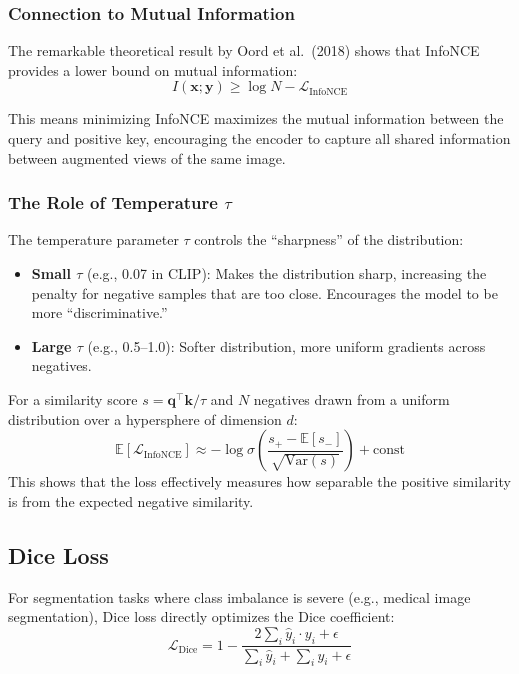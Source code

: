 \subsubsection{Connection to Mutual Information}

The remarkable theoretical result by Oord et al.\ (2018) \cite{oord2018representation} shows that InfoNCE provides a lower bound on mutual information:
\begin{equation}
I(\mathbf{x}; \mathbf{y}) \geq \log N - \mathcal{L}_{\text{InfoNCE}}
\end{equation}

This means minimizing InfoNCE maximizes the mutual information between the query and positive key, encouraging the encoder to capture all shared information between augmented views of the same image.

\subsubsection{The Role of Temperature $\tau$}

The temperature parameter $\tau$ controls the ``sharpness'' of the distribution:
\begin{itemize}
    \item \textbf{Small $\tau$} (e.g., 0.07 in CLIP): Makes the distribution sharp, increasing the penalty for negative samples that are too close. Encourages the model to be more ``discriminative.''
    \item \textbf{Large $\tau$} (e.g., 0.5--1.0): Softer distribution, more uniform gradients across negatives.
\end{itemize}

For a similarity score $s = \mathbf{q}^\top \mathbf{k} / \tau$ and $N$ negatives drawn from a uniform distribution over a hypersphere of dimension $d$:
\begin{equation}
\mathbb{E}[\mathcal{L}_{\text{InfoNCE}}] \approx -\log \sigma\!\left(\frac{s_{+} - \mathbb{E}[s_{-}]}{\sqrt{\text{Var}(s)}}\right) + \text{const}
\end{equation}
This shows that the loss effectively measures how separable the positive similarity is from the expected negative similarity.

\subsection{Dice Loss}

For segmentation tasks where class imbalance is severe (e.g., medical image segmentation), Dice loss \cite{milletari2016v} directly optimizes the Dice coefficient:
\begin{equation}
\mathcal{L}_{\text{Dice}} = 1 - \frac{2 \sum_{i} \hat{y}_i \cdot y_i + \epsilon}{\sum_{i} \hat{y}_i + \sum_{i} y_i + \epsilon}
\end{equation}

